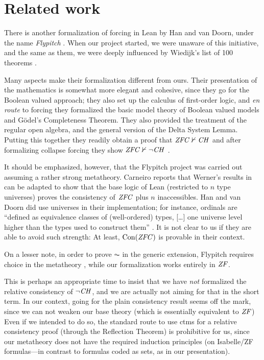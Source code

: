\section{Related work}
\label{sec:related-work}

There is another formalization of forcing in Lean by Han and van
Doorn, under the name \emph{Flypitch} \cite{han_et_al:LIPIcs:2019:11074,DBLP:conf/cpp/HanD20}. When our project started, we
were unaware of this initiative, and the same as them, we were deeply
influenced by Wiedijk's list of 100 theorems \cite{Formalizing100}.

Many aspects make their formalization different from ours. Their
presentation of the mathematics is somewhat more elegant and cohesive,
since they go for the Boolean valued approach; they also  set up the
calculus of first-order logic, and \emph{en route} to forcing they
formalized the basic model theory of Boolean valued models and Gödel's
Completeness Theorem. They also provided the treatment of the regular
open algebra, and the general version of the Delta System
Lemma. Putting this together they readily obtain a proof that
$\mathit{ZFC}\nvdash \mathit{CH}$ \cite{han_et_al:LIPIcs:2019:11074} and after
formalizing collapse forcing they show  $\mathit{ZFC}\nvdash \neg\mathit{CH}$
\cite[Sect.~5.6]{DBLP:conf/cpp/HanD20}.

It should be emphasized, however, that the Flypitch project was
carried out assuming a rather strong metatheory.
Carneiro \cite{carneiro-ms-thesis} reports that Werner's results in
\cite{10.5555/645869.668660} can be adapted to show that the base
logic  of Lean (restricted to $n$
type universes) proves the consistency of $\mathit{ZFC}$ plus $n$
inaccessibles. Han and van Doorn did use universes in their
implementation; for instance, ordinals are “defined as equivalence
classes of (well-ordered) types, [\dots] one
universe level higher than the types used to construct them”
\cite{han_et_al:LIPIcs:2019:11074}. It is not clear to us if they are
able to avoid such strength: At least, $\operatorname{Con}(\mathit{ZFC})$ is provable in
their context. %

On a lesser note, in order to prove $\AC$ in the generic extension,
Flypitch requires choice in the metatheory
\cite[p.~11]{han_et_al:LIPIcs:2019:11074}, while our formalization works
entirely in $\mathit{ZF}$. %

This is perhaps an appropriate time to insist that we have \emph{not}
formalized the relative consistency of $\neg\mathit{CH}$, and we are actually
not aiming for that in the short term. In our context, going for the
plain consistency result seems off the mark, since we can not weaken
our base theory (which is essentially equivalent to $\mathit{ZF}$)%
Even if we intended to do so, the standard route to use ctms for a
relative consistency proof (through the Reflection Theorem) is
prohibitive for us, since our metatheory does not have the required
induction principles (on Isabelle/ZF formulas---in contrast to
formulas coded as sets, as in our presentation).


